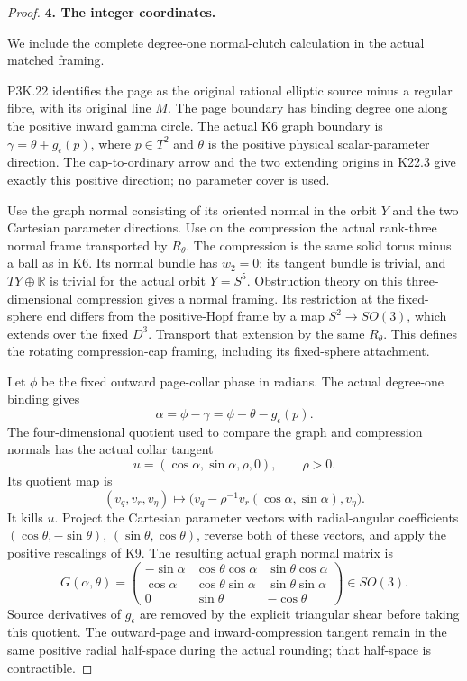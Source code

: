 \begin{proof}
\par\medskip\noindent\textbf{4. The integer coordinates.}\enspace

We include the complete degree-one normal-clutch calculation in the actual matched framing.

P3K.22 identifies the page as the original rational elliptic
source minus a regular fibre, with its original line \(M\).
The page boundary has binding degree one along the positive
inward gamma circle. The actual K6 graph boundary is
\(\gamma=\theta+g_\epsilon(p)\), where \(p\in T^2\) and
\(\theta\) is the positive physical scalar-parameter direction.
The cap-to-ordinary arrow and the two extending origins in K22.3
give exactly this positive direction; no parameter cover is used.

Use the graph normal consisting of its oriented normal in the
orbit \(Y\) and the two Cartesian parameter directions.
Use on the compression the actual rank-three normal frame
transported by \(R_\theta\). The compression is the same solid
torus minus a ball as in K6. Its normal bundle has \(w_2=0\):
its tangent bundle is trivial, and \(TY\oplus\mathbb R\) is
trivial for the actual orbit \(Y=S^5\). Obstruction theory on
this three-dimensional compression gives a normal framing.
Its restriction at the fixed-sphere end differs from the
positive-Hopf frame by a map \(S^2\to SO(3)\), which extends
over the fixed \(D^3\). Transport that extension by the same
\(R_\theta\). This defines the rotating compression-cap
framing, including its fixed-sphere attachment.

Let \(\phi\) be the fixed outward page-collar phase in radians.
The actual degree-one binding gives
\[
                  \alpha=\phi-\gamma
                         =\phi-\theta-g_\epsilon(p).
\]
The four-dimensional quotient used to compare the graph and
compression normals has the actual collar tangent
\[
             u=(\cos\alpha,\sin\alpha,\rho,0),
             \qquad \rho>0.
\]
Its quotient map is
\[
 (v_q,v_r,v_\eta)\longmapsto
       \bigl(v_q-\rho^{-1}v_r(\cos\alpha,\sin\alpha),v_\eta\bigr).
\]
It kills \(u\). Project the Cartesian parameter vectors
with radial-angular coefficients
\((\cos\theta,-\sin\theta)\), \((\sin\theta,\cos\theta)\),
reverse both of these vectors, and apply the positive
rescalings of K9. The resulting actual graph normal matrix is
\[
 G(\alpha,\theta)=
 \begin{pmatrix}
 -\sin\alpha&\cos\theta\cos\alpha&\sin\theta\cos\alpha\\
 \cos\alpha&\cos\theta\sin\alpha&\sin\theta\sin\alpha\\
 0&\sin\theta&-\cos\theta
 \end{pmatrix}\in SO(3).
\]
Source derivatives of \(g_\epsilon\) are removed by the
explicit triangular shear before taking this quotient.
The outward-page and inward-compression tangent remain
in the same positive radial half-space during the actual
rounding; that half-space is contractible.


\end{proof}
